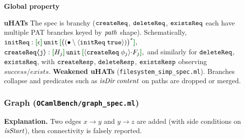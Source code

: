 \textbf{Global property}
\vspace{-.35cm}\par{}
\vspace{-.4cm}\par\nobreak\noindent
\textbf{uHATs}
The spec is branchy (\(\boldsymbol{{\tt createReq}}\), \(\boldsymbol{{\tt deleteReq}}\), \(\boldsymbol{{\tt existsReq}}\) each have multiple PAT branches keyed by \(\mathit{path}\) shape).
Schematically,
\(
\eff{initReq}: \effLR{\empA}\,\Code{unit}\,\effLR{\SNegStar{\msgA{initReq}{\true}}},
\)
\(
\eff{createReq\langle j\rangle}: \effLR{H_j}\,\Code{unit}\,\effLR{\msgA{createReq}{\phi_j} \seqA F_j},
\)
and similarly for \(\boldsymbol{{\tt deleteReq}}\), \(\boldsymbol{{\tt existsReq}}\), with \(\boldsymbol{{\tt createResp}}\), \(\boldsymbol{{\tt deleteResp}}\), \(\boldsymbol{{\tt existsResp}}\) observing \(\mathit{success}/\mathit{exists}\)\@.
\textbf{Weakened uHATs} (\texttt{filesystem\_simp\_spec.ml}).
Branches collapse and predicates such as \(\mathit{isDir}\,\mathit{content}\) on paths are dropped or merged.

\subsubsection*{Graph (\texttt{OCamlBench/graph\_spec.ml})}
\textbf{Explanation.}
Two edges \(x\!\to\!y\) and \(y\!\to\!z\) are added (with side conditions on \(\mathit{isStart}\)), then connectivity is falsely reported.

